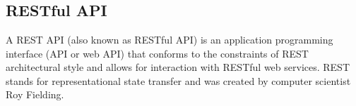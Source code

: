 \section{}





\subsection*{RESTful API}
A REST API (also known as RESTful API) is an application programming interface (API or web API) that conforms to the constraints of REST architectural style and allows for interaction with RESTful web services. REST stands for representational state transfer and was created by computer scientist Roy Fielding.

